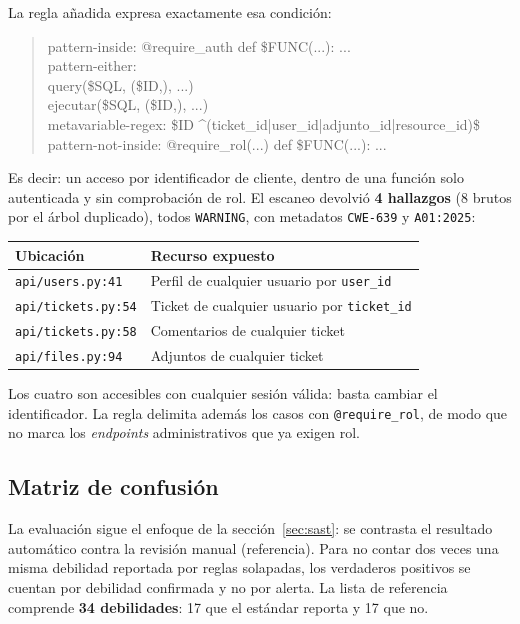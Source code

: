 \documentclass[11pt,letterpaper]{article}
\newcommand{\f}[1]{\texttt{#1}}
\newcommand{\enc}[1]{\textbf{#1}}
\begin{document}
La regla añadida expresa exactamente esa condición:

\begin{quote}\small\ttfamily
pattern-inside: @require\_auth def \$FUNC(...): ...\\
pattern-either:\\
\hspace*{1em}query(\$SQL, (\$ID,), ...)\\
\hspace*{1em}ejecutar(\$SQL, (\$ID,), ...)\\
metavariable-regex: \$ID \^{}(ticket\_id|user\_id|adjunto\_id|resource\_id)\$\\
pattern-not-inside: @require\_rol(...) def \$FUNC(...): ...
\end{quote}

Es decir: un acceso por identificador de cliente, dentro de una función solo autenticada y sin comprobación de rol. El escaneo devolvió \textbf{4 hallazgos} (8 brutos por el árbol duplicado), todos \f{WARNING}, con metadatos \f{CWE-639} y \f{A01:2025}:

\begin{center}
\begin{tabular}{ll}
\toprule
\enc{Ubicación} & \enc{Recurso expuesto} \\
\midrule
\f{api/users.py:41} & Perfil de cualquier usuario por \f{user\_id} \\
\f{api/tickets.py:54} & Ticket de cualquier usuario por \f{ticket\_id} \\
\f{api/tickets.py:58} & Comentarios de cualquier ticket \\
\f{api/files.py:94} & Adjuntos de cualquier ticket \\
\bottomrule
\end{tabular}
\end{center}

Los cuatro son accesibles con cualquier sesión válida: basta cambiar el identificador. La regla delimita además los casos con \f{@require\_rol}, de modo que no marca los \textit{endpoints} administrativos que ya exigen rol.

\subsection{Matriz de confusión}

La evaluación sigue el enfoque de la sección~\ref{sec:sast}: se contrasta el resultado automático contra la revisión manual (referencia). Para no contar dos veces una misma debilidad reportada por reglas solapadas, los verdaderos positivos se cuentan por debilidad confirmada y no por alerta. La lista de referencia comprende \textbf{34 debilidades}: 17 que el estándar reporta y 17 que no.
\end{document}
